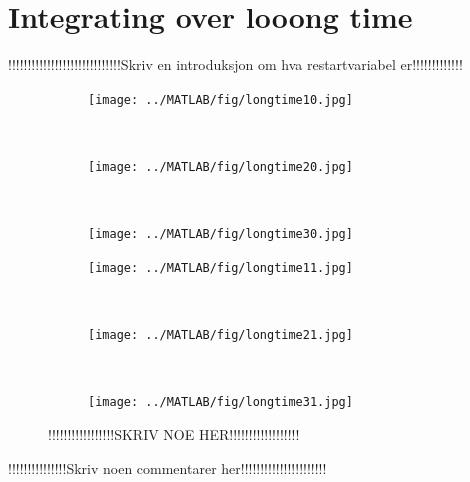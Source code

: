 \chapter{Integrating over looong time}
!!!!!!!!!!!!!!!!!!!!!!!!!!!!!Skriv en introduksjon om hva restartvariabel er!!!!!!!!!!!!!\\
\begin{figure}[H]
        \centering
        \begin{subfigure}[b]{0.3\textwidth}
                \texttt{[image: ../MATLAB/fig/longtime10.jpg]}
                \caption{  }
                \label{fig:restarttimeprob1}
        \end{subfigure}
        ~
        \begin{subfigure}[b]{0.3\textwidth}
                \texttt{[image: ../MATLAB/fig/longtime20.jpg]}
                \caption{  }
                \label{fig:restarttimeprob2}
        \end{subfigure}
        ~
        \begin{subfigure}[b]{0.3\textwidth}
                \texttt{[image: ../MATLAB/fig/longtime30.jpg]}
                \caption{  }
                \label{fig:restarttimeprob2}
        \end{subfigure}
        
        \begin{subfigure}[b]{0.3\textwidth}
                \texttt{[image: ../MATLAB/fig/longtime11.jpg]}
                \caption{  }
                \label{fig:restarttimeprob2}
        \end{subfigure}
        ~
        \begin{subfigure}[b]{0.3\textwidth}
                \texttt{[image: ../MATLAB/fig/longtime21.jpg]}
                \caption{  }
                \label{fig:restarttimeprob2}
        \end{subfigure}
        ~
        \begin{subfigure}[b]{0.3\textwidth}
                \texttt{[image: ../MATLAB/fig/longtime31.jpg]}
                \caption{  }
                \label{fig:restarttimeprob2}
        \end{subfigure}
        \caption{ !!!!!!!!!!!!!!!!!SKRIV NOE HER!!!!!!!!!!!!!!!!!!  }
        \label{fig:restarttimeprob}
\end{figure}
!!!!!!!!!!!!!!!Skriv noen commentarer her!!!!!!!!!!!!!!!!!!!!!!\\
